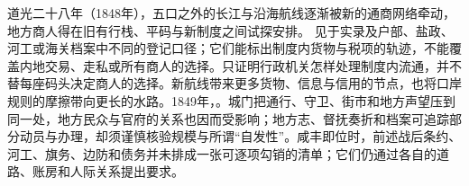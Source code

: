道光二十八年（1848年），五口之外的长江与沿海航线逐渐被新的通商网络牵动，地方商人得在旧有行栈、平码与新制度之间试探安排。 见于实录及户部、盐政、河工或海关档案中不同的登记口径；它们能标出制度内货物与税项的轨迹，不能覆盖内地交易、走私或所有商人的选择。只证明行政机关怎样处理制度内流通，并不替每座码头决定商人的选择。新航线带来更多货物、信息与信用的节点，也将口岸规则的摩擦带向更长的水路。1849年，。城门把通行、守卫、街市和地方声望压到同一处，地方民众与官府的关系也因而受影响；地方志、督抚奏折和档案可追踪部分动员与办理，却须谨慎核验规模与所谓“自发性”。咸丰即位时，前述战后条约、河工、旗务、边防和债务并未排成一张可逐项勾销的清单；它们仍通过各自的道路、账房和人际关系提出要求。
